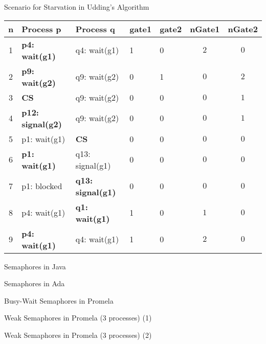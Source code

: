\begin{wideslide}[bm=,toc=]{\large Scenario for Starvation in Udding's Algorithm}
\begin{center}\label{p.udding}
\begin{paenv}
\begin{tabular}{|c|l|l|l|l|c|c|}\hline
n&Process p & Process q & gate1 & gate2 & nGate1 & nGate2\\\hline
1&\bfseries p4: wait(g1)  & q4: wait(g1) &1&0 & $2$ & $0$\\\hline
2&\bfseries p9: wait(g2)  & q9: wait(g2) &0&1& $0$ & $2$\\\hline
3&\bfseries CS  & q9: wait(g2) &0&0& $0$ & $1$\\\hline
4&\bfseries p12: signal(g2)  & q9: wait(g2) &0&0& $0$ & $1$\\\hline
5&p1: wait(g1)  & \bfseries CS &0&0& $0$ & $0$\\\hline
6&\bfseries p1: wait(g1)  & q13: signal(g1) &0&0& $0$ & $0$\\\hline
7&p1: blocked  & \bfseries q13: signal(g1) &0&0& $0$ & $0$\\\hline
8&p4: wait(g1)  & \bfseries q1: wait(g1) &1&0 & $1$ & $0$\\\hline
9&\bfseries p4: wait(g1) & q4: wait(g1) &1&0& $2$ & $0$\\\hline
\end{tabular}
\end{paenv}
\end{center}
\end{wideslide}

\begin{wideslide}[bm=,toc=]{\large Semaphores in Java}
\end{wideslide}

\begin{wideslide}[bm=,toc=]{\large Semaphores in Ada}
\end{wideslide}

\begin{wideslide}[bm=,toc=]{\large Busy-Wait Semaphores in Promela}
\end{wideslide}

\begin{wideslide}[bm=,toc=]{\large Weak Semaphores in Promela (3 processes) (1)}
\end{wideslide}

\begin{wideslide}[bm=,toc=]{\large Weak Semaphores in Promela (3 processes) (2)}
\end{wideslide}

